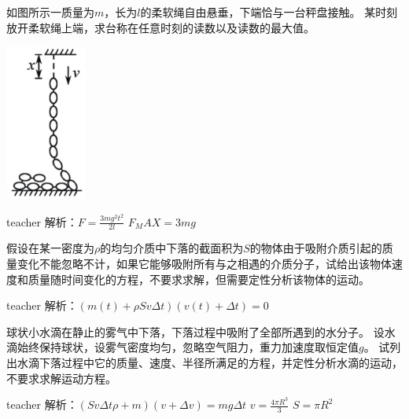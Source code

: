 \begin{example}
如图所示一质量为$m$，长为$l$的柔软绳自由悬垂，下端恰与一台秤盘接触。
某时刻放开柔软绳上端，求台称在任意时刻的读数以及读数的最大值。
	\begin{flushright}
		\includegraphics[width = 0.2\textwidth]{images/momentum-3.pdf} 
	\end{flushright}
\begin{taggedblock}{teacher}
\noindent
解析：$F=\frac{3mg^2t^2}{2l}$ $F_MAX=3mg$
\end{taggedblock}
\end{example}

\begin{example}
假设在某一密度为$\rho$的均匀介质中下落的截面积为$S$的物体由于吸附介质引起的质量变化不能忽略不计，如果它能够吸附所有与之相遇的介质分子，试给出该物体速度和质量随时间变化的方程，不要求求解，但需要定性分析该物体的运动。
\begin{taggedblock}{teacher}
\newline
解析：$(m(t)+\rho Sv\Delta t)(v(t)+\Delta t)=0$
\end{taggedblock}
\end{example}

\begin{example}
球状小水滴在静止的雾气中下落，下落过程中吸附了全部所遇到的水分子。
设水滴始终保持球状，设雾气密度均匀，忽略空气阻力，重力加速度取恒定值$g$。
试列出水滴下落过程中它的质量、速度、半径所满足的方程，并定性分析水滴的运动，不要求求解运动方程。
\begin{taggedblock}{teacher}
\newline
解析：$(Sv\Delta t\rho+m)(v+\Delta v)=mg\Delta t$   $v=\frac{4\pi R^3}{3}$ $S=\pi R^2$
\end{taggedblock}
\end{example}






